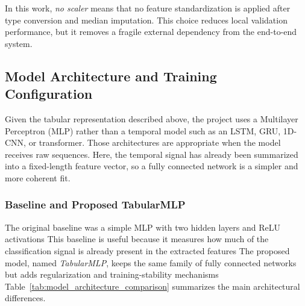 \documentclass[12pt]{article}
\newcommand{\removido}[1]{{\color{COR_REMOVIDO}#1}}
\begin{document}
\begin{table}[H]
\centering
\caption{Comparison between the scaled local-reference pipeline and the selected no-scaler integration pipeline.}
\label{tab:preprocessing_contracts}
\end{table}

In this work, \textit{no scaler} means that no feature standardization is applied after type conversion and median imputation. This choice reduces local validation performance, but it removes a fragile external dependency from the end-to-end system.

\subsection{Model Architecture and Training Configuration}

Given the tabular representation described above, the project uses a Multilayer Perceptron (MLP) rather than a temporal model such as an LSTM, GRU, 1D-CNN, or transformer. Those architectures are appropriate when the model receives raw sequences. Here, the temporal signal has already been summarized into a fixed-length feature vector, so a fully connected network is a simpler and more coherent fit.

\subsubsection{Baseline and Proposed TabularMLP}

The original baseline was a simple MLP with two hidden layers and ReLU activations This baseline is useful because it measures how much of the classification signal is already present in the extracted features The proposed model, named \textit{TabularMLP}, keeps the same family of fully connected networks but adds regularization and training-stability mechanisms \removido{Table~\ref{tab:model_architecture_comparison} summarizes the main architectural differences.}
\end{document}
